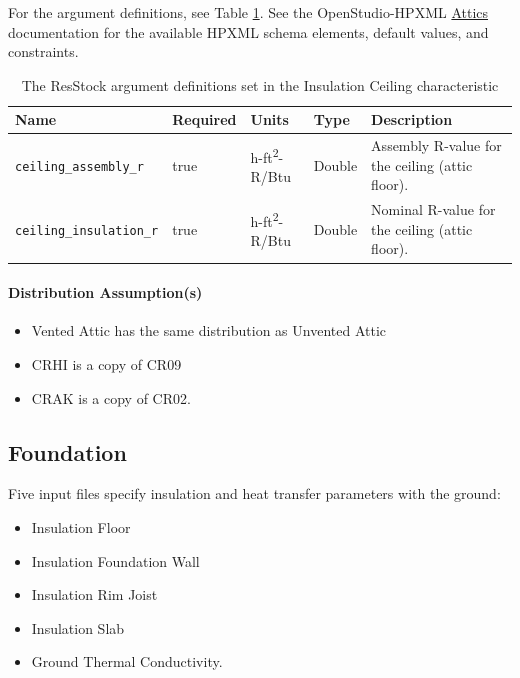 For the argument definitions, see Table \ref{table:hc_arg_def_ins_ceil}. See the OpenStudio-HPXML \href{https://openstudio-hpxml.readthedocs.io/en/v1.8.1/workflow_inputs.html#hpxml-attics}{Attics} documentation for the available HPXML schema elements, default values, and constraints.
\begin{longtable}[]{|p{3.5cm}|p{1.5cm}|p{1.3cm}|p{1.1cm}|p{4.3cm}|} \caption{The ResStock argument definitions set in the Insulation Ceiling characteristic} \label{table:hc_arg_def_ins_ceil} \\

\toprule\noalign{}
Name & Required & Units & Type &  Description \\
\midrule\noalign{}
\endhead
\bottomrule\noalign{}
\endlastfoot
\texttt{ceiling\_assembly\_r} & true & h-ft\textsuperscript{2}-R/Btu & Double & 
Assembly R-value for the ceiling (attic floor). \\
\hline
\texttt{ceiling\_insulation\_r} & true & h-ft\textsuperscript{2}-R/Btu & Double & 
Nominal R-value for the ceiling (attic floor). \\
\end{longtable}

\paragraph{Distribution Assumption(s)}
\begin{itemize}
 
\item
  Vented Attic has the same distribution as Unvented Attic
\item
  CRHI is a copy of CR09
\item
  CRAK is a copy of CR02.
\end{itemize}

\subsection{Foundation}
Five input files specify insulation and heat transfer parameters with the ground:
\begin{itemize}
    \item Insulation Floor
    \item Insulation Foundation Wall
    \item Insulation Rim Joist
    \item Insulation Slab
    \item Ground Thermal Conductivity.
\end{itemize}

